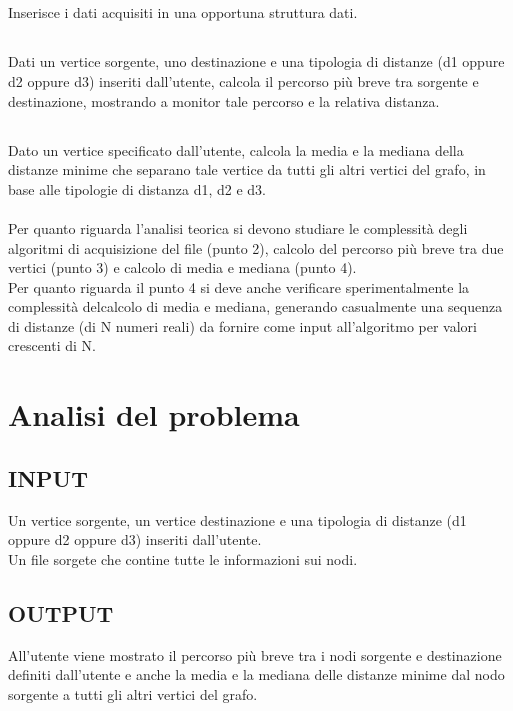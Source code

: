 \documentclass[11pt, a4paper, titlepage, block]{article}
\begin{document}
	\subsection{}
	Inserisce i dati acquisiti in una opportuna struttura dati.
	\subsection{}
	Dati un vertice sorgente, uno destinazione e una tipologia di distanze (d1 oppure d2 oppure d3) inseriti dall'utente, calcola il percorso pi\`{u} breve tra sorgente e destinazione, mostrando a
monitor tale percorso e la relativa distanza.
	\subsection{}
	Dato un vertice specificato dall'utente, calcola la media e la mediana della distanze minime che separano tale vertice da tutti gli altri vertici del grafo, in base alle tipologie di distanza d1, d2 e d3.\\ \\
	Per quanto riguarda l'analisi teorica si devono studiare le complessit\`{a} degli algoritmi di acquisizione del file (punto 2), calcolo del percorso pi\`{u} breve tra due vertici (punto 3) e calcolo di media e mediana (punto 4).\\
	Per quanto riguarda il punto 4 si deve anche verificare sperimentalmente la complessit\`{a} delcalcolo di media e mediana, generando casualmente una sequenza di distanze (di N numeri reali) da fornire come input all'algoritmo per valori crescenti di N.

	\newpage
\section{Analisi del problema}
	\subsection{INPUT}
		Un vertice sorgente, un vertice destinazione e una tipologia di distanze (d1 oppure d2 oppure d3) inseriti dall'utente.\\
		Un file sorgete che contine tutte le informazioni sui nodi.\\
	\subsection{OUTPUT}
		All'utente viene mostrato il percorso pi\`{u} breve tra i nodi sorgente e destinazione definiti dall'utente e anche la media e la mediana delle distanze minime dal nodo sorgente a tutti gli altri vertici del grafo.\\
\end{document}
